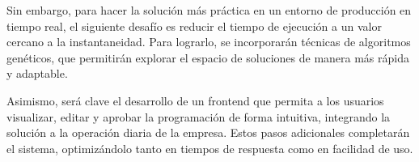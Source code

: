 \documentclass{article}
\begin{document}
Sin embargo, para hacer la solución más práctica en un entorno de producción en tiempo real, el siguiente desafío es reducir el tiempo de ejecución a un valor cercano a la instantaneidad. Para lograrlo, se incorporarán técnicas de algoritmos genéticos, que permitirán explorar el espacio de soluciones de manera más rápida y adaptable.

Asimismo, será clave el desarrollo de un frontend que permita a los usuarios visualizar, editar y aprobar la programación de forma intuitiva, integrando la solución a la operación diaria de la empresa. Estos pasos adicionales completarán el sistema, optimizándolo tanto en tiempos de respuesta como en facilidad de uso.
\end{document}
